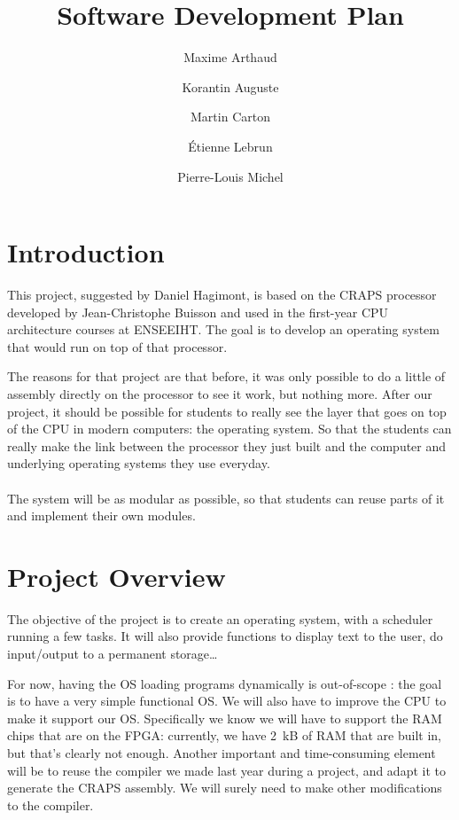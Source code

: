 \documentclass{article}
\title{Software Development Plan}
\author{
       Maxime Arthaud
  \and Korantin Auguste
  \and Martin Carton
  \and Étienne Lebrun
  \and Pierre-Louis Michel
}
\begin{document}
  \maketitle
  \tableofcontents
  \newpage

  \section{Introduction}
    This project, suggested by Daniel Hagimont, is based on the CRAPS processor
    developed by Jean-Christophe Buisson and used in the first-year CPU
    architecture courses at ENSEEIHT. The goal is to develop an operating
    system that would run on top of that processor.

    The reasons for that project are that before, it was only possible to do a
    little of assembly directly on the processor to see it work, but nothing
    more.  After our project, it should be possible for students to really see
    the layer that goes on top of the CPU in modern computers: the operating
    system. So that the students can really make the link between the processor
    they just built and the computer and underlying operating systems they use
    everyday.

    \paragraph{}
    The system will be as modular as possible, so that students can reuse parts
    of it and implement their own modules.

  \section{Project Overview}
    The objective of the project is to create an operating system, with a
    scheduler running a few tasks. It will also provide functions to display
    text to the user, do input/output to a permanent storage\dots

    For now, having the OS loading programs dynamically is out-of-scope : the
    goal is to have a very simple functional OS.  We will also have to improve
    the CPU to make it support our OS. Specifically we know we will have to
    support the RAM chips that are on the FPGA: currently, we have \SI{2}{kB}
    of RAM that are built in, but that's clearly not enough. Another important
    and time-consuming element will be to reuse the compiler we made last year
    during a project, and adapt it to generate the CRAPS assembly. We will
    surely need to make other modifications to the compiler.
\end{document}
